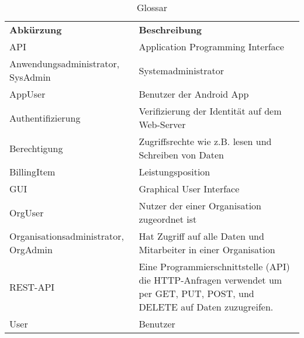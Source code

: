 
\begin{table}[h]
	\centering
	\begin{tabularx}{\textwidth}{X X}
		\rowcolor[HTML]{C0C0C0} 
		\textbf{Abkürzung} & \textbf{Beschreibung} \\
		API & Application Programming Interface\\

		\rowcolor[HTML]{E7E7E7} 
		Anwendungsadministrator, SysAdmin & Systemadministrator \\

		AppUser & Benutzer der Android App \\
		\rowcolor[HTML]{E7E7E7} 		
		Authentifizierung & Verifizierung der Identität auf dem Web-Server \\
		

		Berechtigung & Zugriffsrechte wie z.B. lesen und Schreiben von Daten \\
				\rowcolor[HTML]{E7E7E7} 
		BillingItem & Leistungsposition \\
		GUI & Graphical User Interface \\

		\rowcolor[HTML]{E7E7E7} 

		OrgUser & Nutzer der einer Organisation zugeordnet ist \\


		Organisationsadministrator, OrgAdmin & Hat Zugriff auf alle Daten und Mitarbeiter in einer Organisation \\
		\rowcolor[HTML]{E7E7E7} 		
		REST-API & Eine Programmierschnittstelle (API) die HTTP-Anfragen verwendet um per GET, PUT, POST, und DELETE auf Daten zuzugreifen.\\

		User & Benutzer \\
	\end{tabularx}
	\caption{Glossar}
	\label{table:glossar}
\end{table}